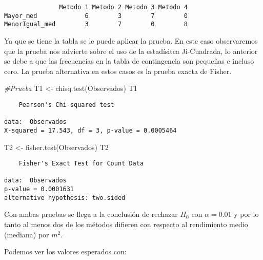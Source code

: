 \documentclass[
  a4paper,
  oneside,
  openany]{book}
\newenvironment{Shaded}{\begin{snugshade}}{\end{snugshade}}
\newcommand{\CommentTok}[1]{\textcolor[rgb]{0.56,0.35,0.01}{\textit{#1}}}
\newcommand{\FunctionTok}[1]{\textcolor[rgb]{0.00,0.00,0.00}{#1}}
\newcommand{\NormalTok}[1]{#1}
\newcommand{\OtherTok}[1]{\textcolor[rgb]{0.56,0.35,0.01}{#1}}
\newcommand{\SpecialCharTok}[1]{\textcolor[rgb]{0.00,0.00,0.00}{#1}}
\begin{document}
\begin{verbatim}
               Metodo 1 Metodo 2 Metodo 3 Metodo 4
Mayor_med             6        3        7        0
MenorIgual_med        3        7        0        8
\end{verbatim}

Ya que se tiene la tabla se le puede aplicar la prueba. En este caso observaremos que la prueba nos advierte sobre el uso de la estadísitca Ji-Cuadrada, lo anterior se debe a que las frecuencias en la tabla de contingencia son pequeñas e incluso cero. La prueba alternativa en estos casos es la prueba exacta de Fisher.

\begin{Shaded}
\begin{Highlighting}[]
\CommentTok{\#Prueba}
\NormalTok{T1 }\OtherTok{\textless{}{-}} \FunctionTok{chisq.test}\NormalTok{(Observados)}
\NormalTok{T1}
\end{Highlighting}
\end{Shaded}

\begin{verbatim}
    Pearson's Chi-squared test

data:  Observados
X-squared = 17.543, df = 3, p-value = 0.0005464
\end{verbatim}

\begin{Shaded}
\begin{Highlighting}[]
\NormalTok{T2 }\OtherTok{\textless{}{-}} \FunctionTok{fisher.test}\NormalTok{(Observados)}
\NormalTok{T2}
\end{Highlighting}
\end{Shaded}

\begin{verbatim}
    Fisher's Exact Test for Count Data

data:  Observados
p-value = 0.0001631
alternative hypothesis: two.sided
\end{verbatim}

Con ambas pruebas se llega a la conclusión de rechazar \(H_0\) con \(\alpha=0.01\) y por lo tanto al menos dos de los métodos difieren con respecto al rendimiento medio (mediana) por \(m^2\).

Podemos ver los valores esperados con:

\begin{Shaded}
\end{Shaded}
\end{document}
